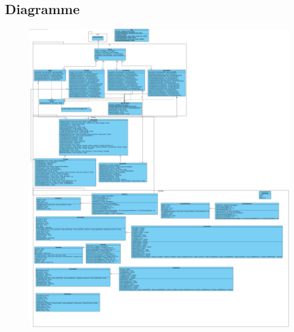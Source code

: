 \newpage
\subsection{Diagramme}
\begin{figure}[h]
\centering
\includegraphics[width = 1\textwidth]{Extension-claire/Class-claire/img/class.png}
\end{figure}
